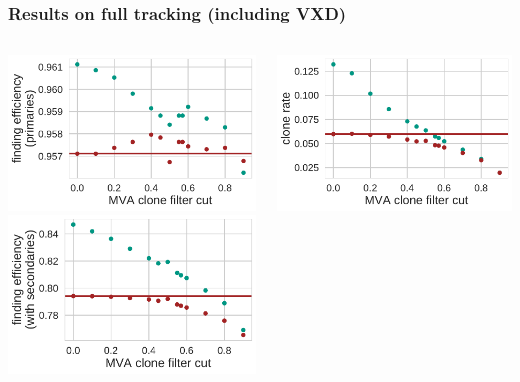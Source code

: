 \documentclass[18pt, aspectratio=169]{beamer}
\begin{document}
\begin{frame}
  \frametitle{Results on full tracking (including VXD)}
  \begin{columns}
    \begin{column}{0.3\textwidth}
      \centering
      \includegraphics[width=1.0\textwidth]{figures/ca_is_matched_primaries_fullreco_trainedWithFakes.pdf}\\
      \includegraphics[width=1.0\textwidth]{figures/ca_is_matched_with_secondaries_fullreco_trainedWithFakes.pdf}
    \end{column}
    \begin{column}{0.3\textwidth}
      \centering
      \includegraphics[width=1.0\textwidth]{figures/ca_clone_rate_fullreco_trainedWithFakes.pdf}\\

\end{column}
\end{columns}
\end{frame}
\end{document}

